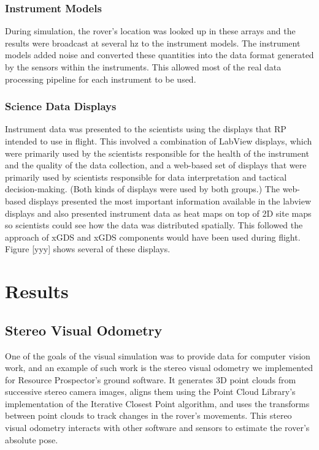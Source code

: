 \documentclass[twocolumn,letterpaper]{IEEEAerospaceCLS}  %
\begin{document}
\subsubsection{Instrument Models}
During simulation, the rover's location was looked up in these arrays and the results were broadcast at several hz to the instrument models.  
The instrument models added noise and converted these quantities into the data format generated by the sensors within the instruments.  
This allowed most of the real data processing pipeline for each instrument to be used.

\subsubsection{Science Data Displays}
Instrument data was presented to the scientists using the displays that RP intended to use in flight.  
This involved a combination of LabView displays, which were primarily used by the scientists responsible for the health of the instrument and the quality of the data collection, and a web-based set of displays \cite{OpenMCT} that were primarily used by scientists responsible for data interpretation and tactical decision-making.  
(Both kinds of displays were used by both groups.)  The web-based displays presented the most important information available in the labview displays and also presented instrument data as heat maps on top of 2D site maps so scientists could see how the data was distributed spatially.  
This followed the approach of xGDS \cite{lee2013reusable} and xGDS components would have been used during flight.  Figure [yyy] shows several of these displays.

\section{Results}

\subsection{Stereo Visual Odometry}
One of the goals of the visual simulation was to provide data for computer vision work, and an example of such work is the stereo visual odometry we implemented for Resource Prospector's ground software.
It generates 3D point clouds from successive stereo camera images, aligns them using the Point Cloud Library's implementation of the Iterative Closest Point algorithm, and uses the transforms between point clouds to track changes in the rover's movements.
This stereo visual odometry interacts with other software and sensors to estimate the rover's absolute pose.
\end{document}

